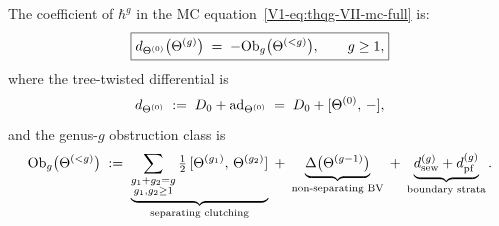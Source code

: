 \begin{proposition}
The coefficient of $\hbar^g$ in the MC
equation~\eqref{V1-eq:thqg-VII-mc-full} is:
\begin{equation}%
\boxed{
d_{\Theta^{(0)}}\bigl(\Theta^{(g)}\bigr)
\;=\;
-\Ob_g\bigl(\Theta^{(<g)}\bigr),
\qquad g \geq 1,
}
\end{equation}
where the tree-twisted differential is
\begin{equation}%
d_{\Theta^{(0)}}
\;:=\;
D_0 + \ad_{\Theta^{(0)}}
\;=\;
D_0 + [\Theta^{(0)},\, -],
\end{equation}
and the genus-$g$ obstruction class is
\begin{equation}%
\Ob_g\bigl(\Theta^{(<g)}\bigr)
\;:=\;
\underbrace{
\sum_{\substack{g_1 + g_2 = g \\ g_1, g_2 \geq 1}}
\tfrac{1}{2}\,[\Theta^{(g_1)},\, \Theta^{(g_2)}]
}_{\text{separating clutching}}
\;+\;
\underbrace{
\Delta\bigl(\Theta^{(g-1)}\bigr)
}_{\text{non-separating BV}}
\;+\;
\underbrace{
\dsew^{(g)} + \dpf^{(g)}
}_{\text{boundary strata}}.
\end{equation}
\end{proposition}

